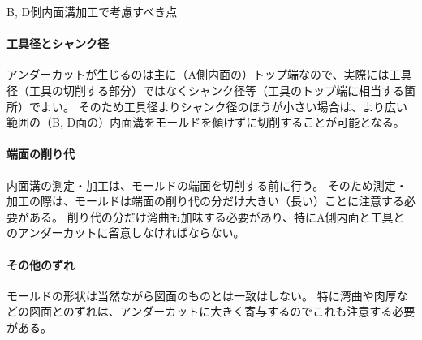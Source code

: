 \begin{Column}{B, D側内面溝加工で考慮すべき点}
\paragraph{工具径とシャンク径}
アンダーカットが生じるのは主に（A側内面の）トップ端なので、実際には工具径（工具の切削する部分）ではなくシャンク径等（工具のトップ端に相当する箇所）でよい。
そのため工具径よりシャンク径のほうが小さい場合は、より広い範囲の（B, D面の）内面溝をモールドを傾けずに切削することが可能となる。
\tcbline*
\paragraph{端面の削り代}
内面溝の測定・加工は、モールドの端面を切削する前に行う。
そのため測定・加工の際は、モールドは端面の削り代の分だけ大きい（長い）ことに注意する必要がある。
削り代の分だけ湾曲も加味する必要があり、特にA側内面と工具とのアンダーカットに留意しなければならない。
\tcbline*
\paragraph{その他のずれ}
モールドの形状は当然ながら図面のものとは一致はしない。
特に湾曲や肉厚などの図面とのずれは、アンダーカットに大きく寄与するのでこれも注意する必要がある。
\end{Column}





